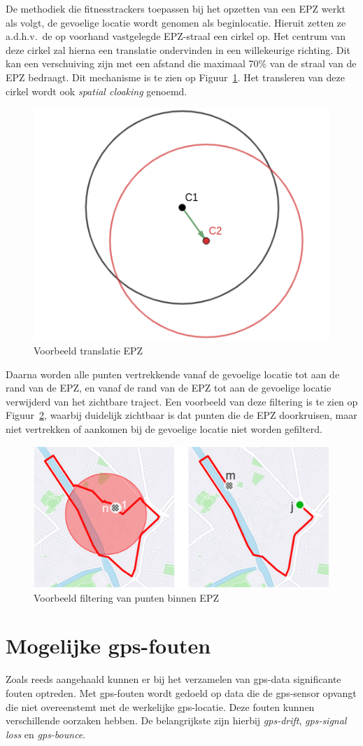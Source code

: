 De methodiek die fitnesstrackers toepassen bij het opzetten van een \ac{EPZ}
werkt als volgt, de gevoelige locatie wordt genomen als beginlocatie. Hieruit
zetten ze a.d.h.v.\ de op voorhand vastgelegde \ac{EPZ}-straal een cirkel op.
Het centrum van deze cirkel zal hierna een translatie ondervinden in een
willekeurige richting. Dit kan een verschuiving zijn met een afstand die
maximaal 70\% van de straal van de \ac{EPZ} bedraagt. Dit mechanisme is te zien
op Figuur~\ref{fig:translation}. Het transleren van deze cirkel wordt ook
\textit{spatial cloaking} genoemd.
\begin{figure}[h]
    \centering
    \includegraphics[width=0.4\linewidth]{fig/EPZ-mechanisme/Translation_Center.png}
    \caption{Voorbeeld translatie EPZ}\label{fig:translation}
\end{figure}

Daarna worden alle punten vertrekkende vanaf de gevoelige locatie tot aan de
rand van de \ac{EPZ}, en vanaf de rand van de \ac{EPZ} tot aan de gevoelige
locatie verwijderd van het zichtbare traject. Een voorbeeld van deze filtering
is te zien op Figuur~\ref{fig:drop points}, waarbij duidelijk zichtbaar is dat
punten die de \ac{EPZ} doorkruisen, maar niet vertrekken of aankomen bij de
gevoelige locatie niet worden gefilterd.
\begin{figure}[h]
    \centering
    \includegraphics[width=0.7\linewidth]{fig/EPZ-mechanisme/DropEPZPoints.png}
    \caption{Voorbeeld filtering van punten binnen EPZ~\cite{Dhondt}}\label{fig:drop points}
\end{figure}

\section{Mogelijke gps-fouten}\label{sec:gps-fouten}
Zoals reeds aangehaald kunnen er bij het verzamelen van \ac{gps}-data
significante fouten optreden. Met \ac{gps}-fouten wordt gedoeld op data die de
\ac{gps}-sensor opvangt die niet overeenstemt met de werkelijke
\ac{gps}-locatie. Deze fouten kunnen verschillende oorzaken hebben. De
belangrijkste zijn hierbij \textit{\ac{gps}-drift}, \textit{\ac{gps}-signal
    loss} en \textit{\ac{gps}-bounce}.

